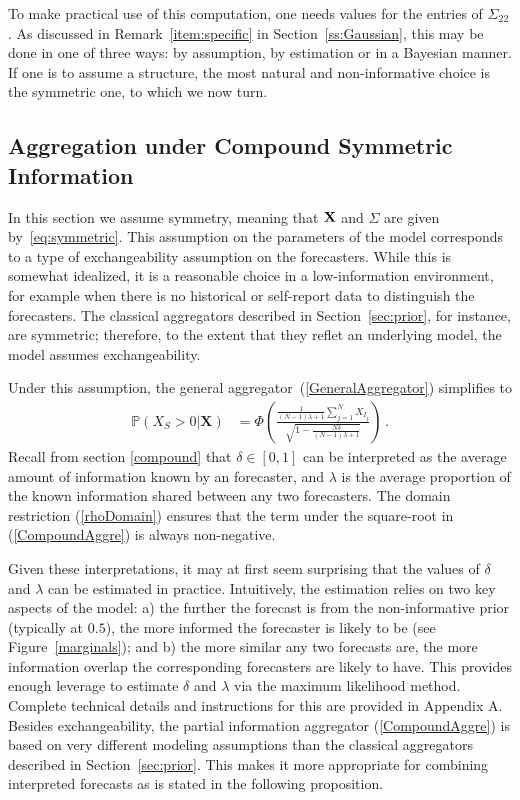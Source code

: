 \documentclass[11pt]{article}
\renewcommand{\P}{\mathbb{P}}
\theoremstyle{definition}
\theoremstyle{definition}
\def\P{{\mathbb P}}
\begin{document}
To make practical use of this computation, one needs values
for the entries of $\Sigma_{22}$.  As discussed in 
Remark~\ref{item:specific} in Section~\ref{ss:Gaussian},
this may be done in one of three ways: by assumption, 
by estimation or in a Bayesian manner.  If one is to assume
a structure, the most natural and non-informative choice is
the symmetric one, to which we now turn.


\subsection{Aggregation under Compound Symmetric Information}
\label{compound2}

In this section we assume symmetry, meaning that ${\bf X}$ and
$\Sigma$ are given by~\eqref{eq:symmetric}.  This assumption
on the parameters of the model corresponds to a type of exchangeability
assumption on the forecasters.  While this is somewhat idealized,
it is a reasonable choice in a low-information environment, for
example when there is no historical or self-report data to
distinguish the forecasters.  The classical aggregators described in 
Section~\ref{sec:prior}, for instance, are symmetric; therefore,
to the extent that they reflet an underlying model, the model 
assumes exchangeability.

Under this assumption, the general aggregator~(\ref{GeneralAggregator}) 
simplifies to
\begin{align}
\P\left(X_S > 0 | \boldsymbol{X}\right) 
  &=\Phi\left(\frac{\frac{1}{(N-1)\lambda +1} 
  \sum_{j=1}^N X_{I_j} }{\sqrt{1- \frac{N\delta}{(N-1)\lambda +1} }}  
  \right) \, . \label{CompoundAggre}
\end{align}
Recall from section \ref{compound} that $\delta \in [0,1]$ can be 
interpreted as the average amount of information known by an forecaster, 
and $\lambda$ is the average proportion of the known information shared 
between any two forecasters.  The domain restriction (\ref{rhoDomain}) 
ensures that the term under the square-root in (\ref{CompoundAggre}) 
is always non-negative.

Given these interpretations, it may at first seem surprising that 
the values of $\delta$ and $\lambda$ can be estimated in practice. 
Intuitively, the estimation relies on two key aspects of the model: 
a) the further the forecast is from the non-informative prior 
(typically at $0.5$), the more informed the forecaster is likely to be 
(see Figure~\ref{marginals}); and b) the more similar any two forecasts 
are, the more information overlap the corresponding forecasters are likely 
to have. This provides enough leverage to estimate $\delta$ and $\lambda$   
via the maximum likelihood method.  Complete technical details and 
instructions for this are provided in Appendix A.  Besides exchangeability, 
the partial information aggregator (\ref{CompoundAggre}) is based on 
very different modeling assumptions than the classical aggregators 
described in Section~\ref{sec:prior}. This makes it more appropriate 
for combining interpreted forecasts as is stated in the following 
proposition.
\end{document}
